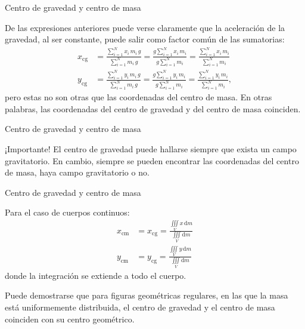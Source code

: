 \documentclass[11pt,handout,aspectratio=1610]{beamer}
\newcommand{\vs}{\vspace{11pt}}
\begin{document}
\begin{frame}{Centro de gravedad y centro de masa}
    
    De las expresiones anteriores puede verse claramente que la aceleración de la gravedad, al ser constante, puede salir como factor común de las sumatorias:
    \begin{align*}
        x_\text{cg} &= \frac{\sum\limits_{i=1}^{N} x_i \, m_i \, g}{\sum\limits_{i=1}^{N} m_i \, g} = \frac{g \sum\limits_{i=1}^{N} x_i \, m_i}{g \sum\limits_{i=1}^{N} m_i} = \frac{\sum\limits_{i=1}^{N} x_i \, m_i}{\sum\limits_{i=1}^{N} m_i}\\
        y_\text{cg} &= \frac{\sum\limits_{i=1}^{N} y_i \, m_i \, g}{\sum\limits_{i=1}^{N} m_i \, g} = \frac{g \sum\limits_{i=1}^{N} y_i \, m_i}{g \sum\limits_{i=1}^{N} m_i} = \frac{\sum\limits_{i=1}^{N} y_i \, m_i}{\sum\limits_{i=1}^{N} m_i},
    \end{align*} pero estas no son otras que las coordenadas del centro de masa. En otras palabras, las coordenadas del centro de gravedad y del centro de masa coinciden.
    
\end{frame}

\begin{frame}{Centro de gravedad y centro de masa}

    \begin{alertblock}{¡Importante!}
        El centro de gravedad puede hallarse siempre que exista un campo gravitatorio. En cambio, siempre se pueden encontrar las coordenadas del centro de masa, haya campo gravitatorio o no.
    \end{alertblock}
    
\end{frame}

\begin{frame}{Centro de gravedad y centro de masa}

    Para el caso de cuerpos continuos:
    \begin{align*}
        x_\text{cm} &= x_\text{cg} = \frac{\iiint\limits_{V} x \, \text{d}m}{\iiint\limits_{V} \text{d}m} \\
        y_\text{cm} &= y_\text{cg} = \frac{\iiint\limits_{V} y \, \text{d}m}{\iiint\limits_{V} \text{d}m}
    \end{align*} donde la integración se extiende a todo el cuerpo.

    \vs

    Puede demostrarse que para figuras geométricas regulares, en las que la masa está uniformemente distribuida, el centro de gravedad y el centro de masa coinciden con su centro geométrico.

\end{frame}
\end{document}
